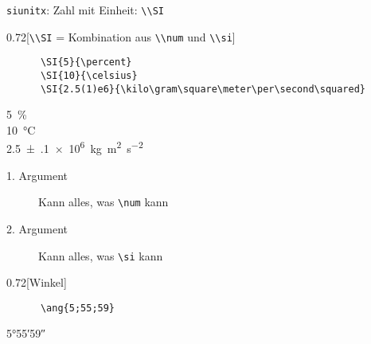 \begin{frame}[fragile]{\texttt{siunitx}: Zahl mit Einheit: \lstinline+\\SI+}
  \begin{CodeExample}{0.72}[\lstinline+\\SI+ {=} Kombination aus \lstinline+\\num+ und \lstinline+\\si+]
    \begin{lstlisting}
      \SI{5}{\percent}
      \SI{10}{\celsius}
      \SI{2.5(1)e6}{\kilo\gram\square\meter\per\second\squared}
    \end{lstlisting}
  \CodeResult
    \strut
    \SI{5}{\percent} \\
    \SI{10}{\celsius} \\
    \SI{2.5(1)e6}{\kilo\gram\square\meter\per\second\squared}
  \end{CodeExample}
  \begin{description}
    \item[1. Argument] Kann alles, was \lstinline+\num+ kann
    \item[2. Argument] Kann alles, was \lstinline+\si+ kann
  \end{description}
  \begin{CodeExample}{0.72}[Winkel]
    \begin{lstlisting}
      \ang{5;55;59}
    \end{lstlisting}
  \CodeResult
    \strut
    \ang{5;55;59}
  \end{CodeExample}
\end{frame}
